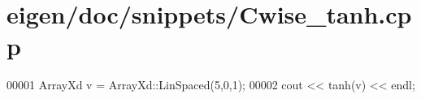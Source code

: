\hypertarget{eigen_2doc_2snippets_2_cwise__tanh_8cpp_source}{}\section{eigen/doc/snippets/\+Cwise\+\_\+tanh.cpp}
\label{eigen_2doc_2snippets_2_cwise__tanh_8cpp_source}

\begin{DoxyCode}
00001 ArrayXd v = ArrayXd::LinSpaced(5,0,1);
00002 cout << tanh(v) << endl;
\end{DoxyCode}
